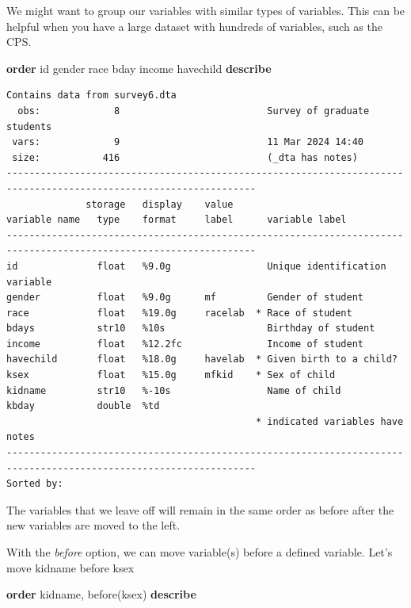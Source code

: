 \documentclass[
]{book}
\newenvironment{Shaded}{\begin{snugshade}}{\end{snugshade}}
\newcommand{\KeywordTok}[1]{\textcolor[rgb]{0.13,0.29,0.53}{\textbf{#1}}}
\newcommand{\NormalTok}[1]{#1}
\begin{document}
We might want to group our variables with similar types of variables. This can be helpful when you have a large dataset with hundreds of variables, such as the CPS.

\begin{Shaded}
\begin{Highlighting}[]
\KeywordTok{order}\NormalTok{ id gender race bday income havechild}
\KeywordTok{describe}
\end{Highlighting}
\end{Shaded}

\begin{verbatim}
Contains data from survey6.dta
  obs:             8                          Survey of graduate students
 vars:             9                          11 Mar 2024 14:40
 size:           416                          (_dta has notes)
------------------------------------------------------------------------------------------------------------------
              storage   display    value
variable name   type    format     label      variable label
------------------------------------------------------------------------------------------------------------------
id              float   %9.0g                 Unique identification variable
gender          float   %9.0g      mf         Gender of student
race            float   %19.0g     racelab  * Race of student
bdays           str10   %10s                  Birthday of student
income          float   %12.2fc               Income of student
havechild       float   %18.0g     havelab  * Given birth to a child?
ksex            float   %15.0g     mfkid    * Sex of child
kidname         str10   %-10s                 Name of child
kbday           double  %td                   
                                            * indicated variables have notes
------------------------------------------------------------------------------------------------------------------
Sorted by: 
\end{verbatim}

The variables that we leave off will remain in the same order as before after the new variables are moved to the left.

With the \emph{before} option, we can move variable(s) before a defined variable. Let's move kidname before ksex

\begin{Shaded}
\begin{Highlighting}[]
\KeywordTok{order}\NormalTok{ kidname, before(ksex)}
\KeywordTok{describe}
\end{Highlighting}
\end{Shaded}
\end{document}
